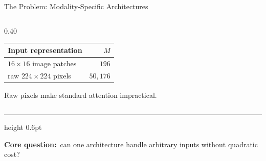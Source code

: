 \documentclass[aspectratio=169,11pt]{beamer}
\begin{document}
\begin{frame}[shrink=10]{The Problem: Modality-Specific Architectures}
\begin{columns}[T,onlytextwidth]
\begin{column}{0.40\textwidth}
      \vspace{0.35em}
      \begin{table}
        \centering\small
        \begin{tabular}{lr}
          \toprule
          \textbf{Input representation} & \textbf{$M$} \\
          \midrule
          $16\!\times\!16$ image patches & $196$ \\
          raw $224\!\times\!224$ pixels & $50{,}176$ \\
          \bottomrule
        \end{tabular}
      \end{table}

      \vspace{0.15em}
      \centering\small
      Raw pixels make standard attention \alert{impractical}.
    \end{column}
  \end{columns}

  \vspace{1.1em}
  {\color{UnifiBlue!25}\hrule height 0.6pt}
  \vspace{0.6em}
  \centering\small
  {\color{UnifiBlue}\textbf{Core question:}}\, can one architecture handle arbitrary inputs without quadratic cost?
\end{frame}

\newcommand{\SolutionCard}[3]{%
  \begin{beamercolorbox}[wd=\linewidth,rounded=true,shadow=true,sep=0pt]{solution card body}
    \begin{beamercolorbox}[wd=\linewidth,rounded=true,sep=0.06cm,leftskip=0.16cm]{solution card title}
      {\normalsize #1}
    \end{beamercolorbox}
    \vspace{0.10em}
    \hspace{0.16cm}\begin{minipage}[t][0.74cm][t]{0.88\linewidth}
      \raggedright
      \hyphenpenalty=10000\exhyphenpenalty=10000
      {\scriptsize\bfseries #2}\\[-0.10em]
      {\scriptsize #3}
    \end{minipage}
    \vspace{0.10em}
  \end{beamercolorbox}%
}
\end{document}
